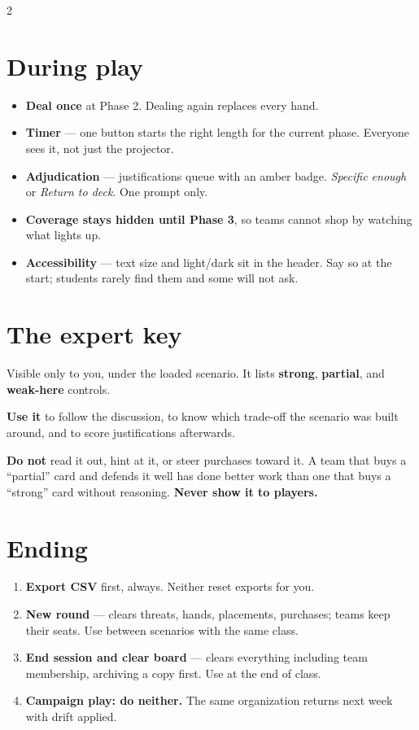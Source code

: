 \documentclass[9pt,letterpaper]{extarticle}
\begin{document}
\begin{multicols}{2}
\section{During play}
\begin{itemize}
\item \textbf{Deal once} at Phase 2. Dealing again replaces every hand.
\item \textbf{Timer} --- one button starts the right length for the current phase.
Everyone sees it, not just the projector.
\item \textbf{Adjudication} --- justifications queue with an amber badge.
\emph{Specific enough} or \emph{Return to deck}. One prompt only.
\item \textbf{Coverage stays hidden until Phase 3}, so teams cannot shop by
watching what lights up.
\item \textbf{Accessibility} --- text size and light/dark sit in the header. Say
so at the start; students rarely find them and some will not ask.
\end{itemize}

\columnbreak

\section{The expert key}
Visible only to you, under the loaded scenario. It lists \textbf{strong},
\textbf{partial}, and \textbf{weak-here} controls.

\vspace{0.3em}
\textbf{Use it} to follow the discussion, to know which trade-off the scenario
was built around, and to score justifications afterwards.

\vspace{0.3em}
\textbf{Do not} read it out, hint at it, or steer purchases toward it. A team
that buys a ``partial'' card and defends it well has done better work than one
that buys a ``strong'' card without reasoning. \textbf{Never show it to players.}

\section{Ending}
\begin{enumerate}[label=\arabic*.]
\item \textbf{Export CSV} first, always. Neither reset exports for you.
\item \textbf{New round} --- clears threats, hands, placements, purchases; teams
keep their seats. Use between scenarios with the same class.
\item \textbf{End session and clear board} --- clears everything including team
membership, archiving a copy first. Use at the end of class.
\item \textbf{Campaign play: do neither.} The same organization returns next week
with drift applied.
\end{enumerate}

\end{multicols}
\end{document}
